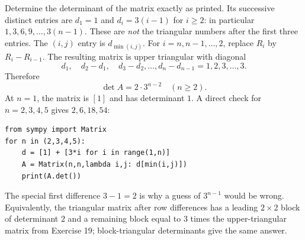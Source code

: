 \goal Determine the determinant of the matrix exactly as printed.
Its successive distinct entries are $d_1=1$ and $d_i=3(i-1)$ for $i\ge2$: in particular $1,3,6,9,\ldots,3(n-1)$. These are \emph{not} the triangular numbers after the first three entries. The $(i,j)$ entry is $d_{\min(i,j)}$.
For $i=n,n-1,\ldots,2$, replace $R_i$ by $R_i-R_{i-1}$. The resulting matrix is upper triangular with diagonal
\[
d_1,\quad d_2-d_1,\quad d_3-d_2,\ldots,d_n-d_{n-1}
=1,2,3,\ldots,3.
\]
Therefore
\[
\boxed{\det A=2\cdot3^{n-2}\quad(n\ge2).}
\]
At $n=1$, the matrix is $[1]$ and has determinant $1$.
A direct check for $n=2,3,4,5$ gives $2,6,18,54$:
\begin{verbatim}
from sympy import Matrix
for n in (2,3,4,5):
    d = [1] + [3*i for i in range(1,n)]
    A = Matrix(n,n,lambda i,j: d[min(i,j)])
    print(A.det())
\end{verbatim}
The special first difference $3-1=2$ is why a guess of $3^{n-1}$ would be wrong. Equivalently, the triangular matrix after row differences has a leading $2\times2$ block of determinant $2$ and a remaining block equal to $3$ times the upper-triangular matrix from Exercise 19; block-triangular determinants give the same answer.
